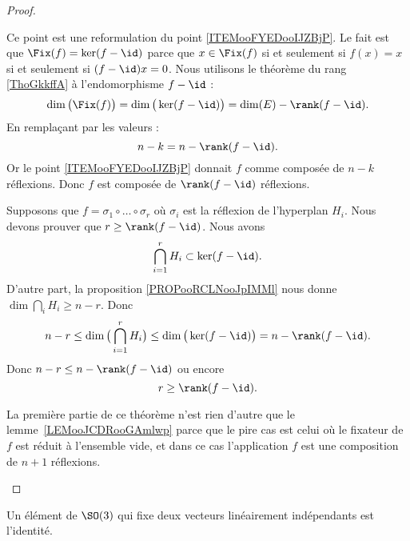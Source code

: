 \begin{proof}
\begin{subproof}
		Ce point est une reformulation du point \ref{ITEMooFYEDooIJZBjP}. Le fait est que \( \Fix(f)=\ker(f-\id)\) parce que \( x\in\Fix(f)\) si et seulement si \( f(x)=x\) si et seulement si \( (f-\id)x=0\). Nous utilisons le théorème du rang \ref{ThoGkkffA} à l'endomorphisme \( f-\id\) :
		\begin{equation}
			\dim\big( \Fix(f) \big)=\dim\big( \ker(f-\id) \big)=\dim(E)-\rank(f-\id).
		\end{equation}
		En remplaçant par les valeurs :
		\begin{equation}
			n-k=n-\rank(f-\id).
		\end{equation}
		Or le point \ref{ITEMooFYEDooIJZBjP} donnait \( f\) comme composée de \( n-k\) réflexions. Donc \( f\) est composée de \( \rank(f-\id)\) réflexions.

		Supposons que \( f=\sigma_1\circ\ldots \circ \sigma_r\) où \( \sigma_i\) est la réflexion de l'hyperplan \( H_i\). Nous devons prouver que \( r\geq \rank(f-\id)\). Nous avons
		\begin{equation}
			\bigcap_{i=1}^rH_i\subset \ker(f-\id).
		\end{equation}
		D'autre part, la proposition \ref{PROPooRCLNooJpIMMl} nous donne \( \dim\bigcap_iH_i\geq n-r\). Donc
		\begin{equation}
			n-r\leq \dim\big( \bigcap_{i=1}^r H_i\big)\leq\dim\big( \ker(f-\id) \big)=n-\rank(f-\id).
		\end{equation}
		Donc \( n-r\leq n-\rank(f-\id)\) ou encore
		\begin{equation}
			r\geq \rank(f-\id).
		\end{equation}

		La première partie de ce théorème n'est rien d'autre que le lemme~\ref{LEMooJCDRooGAmlwp} parce que le pire cas est celui où le fixateur de \( f\) est réduit à l'ensemble vide, et dans ce cas l'application \( f\) est une composition de \( n+1\) réflexions.
	\end{subproof}
\end{proof}

\begin{proposition}     \label{PROPooUSKEooUbNVfs}
	Un élément de \( \SO(3)\) qui fixe deux vecteurs linéairement indépendants est l'identité.
\end{proposition}

